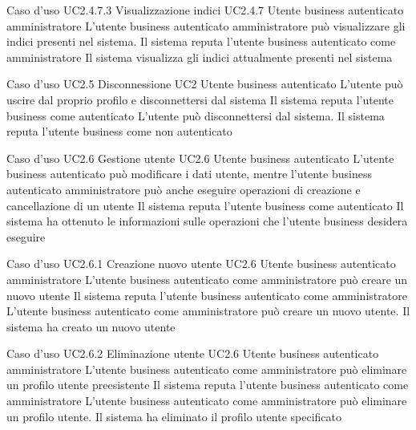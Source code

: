 \UCtitle
{Caso d'uso UC2.4.7.3}
{Visualizzazione indici}
\UC
{UC2.4.7}
{Utente business autenticato amministratore}
{L'utente business autenticato amministratore può visualizzare gli indici presenti nel sistema.}
{Il sistema reputa l'utente business autenticato come amministratore}
\post
{Il sistema visualizza gli indici attualmente presenti nel sistema}

\UCtitle
{Caso d'uso UC2.5}
{Disconnessione}
\UC
{UC2}
{Utente business autenticato}
{L'utente può uscire dal proprio profilo e disconnettersi dal sistema}
{Il sistema reputa l'utente business come autenticato}
\scenario
{L'utente può disconnettersi dal sistema.}
\post
{Il sistema reputa l'utente business come non autenticato}

\UCtitle
{Caso d'uso UC2.6}
{Gestione utente}
\UC
{UC2.6}
{Utente business autenticato}
{L'utente business autenticato può modificare i dati utente, mentre l'utente business autenticato amministratore può anche eseguire operazioni di creazione e cancellazione di un utente}
{Il sistema reputa l'utente business come autenticato}
\post
{Il sistema ha ottenuto le informazioni sulle operazioni che l'utente business desidera eseguire}

\UCtitle
{Caso d'uso UC2.6.1}
{Creazione nuovo utente}
\UC
{UC2.6}
{Utente business autenticato amministratore}
{L'utente business autenticato come amministratore può creare un nuovo utente}
{Il sistema reputa l'utente business autenticato come amministratore}
\scenario
{L'utente business autenticato come amministratore può creare un nuovo utente.}
\post
{Il sistema ha creato un nuovo utente}


\UCtitle
{Caso d'uso UC2.6.2}
{Eliminazione utente}
\UC
{UC2.6}
{Utente business autenticato amministratore}
{L'utente business autenticato come amministratore può eliminare un profilo utente preesistente}
{Il sistema reputa l'utente business autenticato come amministratore}
\scenario
{L'utente business autenticato come amministratore può eliminare un profilo utente.}
\post
{Il sistema ha eliminato il profilo utente specificato}

